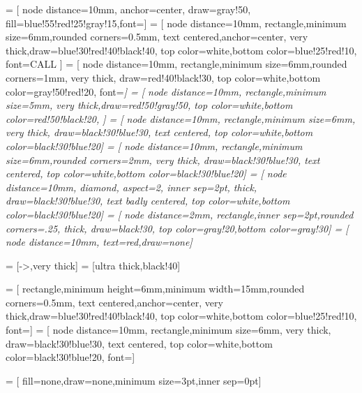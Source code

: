   = [
      node distance=10mm,
      anchor=center,
      draw=gray!50,
      fill=blue!55!red!25!gray!15,font=\scriptsize]
    = [
      node distance=10mm,
      rectangle,minimum size=6mm,rounded corners=0.5mm,
      text centered,anchor=center,
      very thick,draw=blue!30!red!40!black!40,
      top color=white,bottom color=blue!25!red!10,
      font=CALL \ttfamily]
        = [
      node distance=10mm,
      rectangle,minimum size=6mm,rounded corners=1mm,
      very thick, draw=red!40!black!30,
      top color=white,bottom color=gray!50!red!20,
      font=\scriptsize\itshape]
    = [
      node distance=10mm,
      rectangle,minimum size=5mm,
      very thick,draw=red!50!gray!50,
      top color=white,bottom color=red!50!black!20,
      ]
     = [
      node distance=10mm,
      rectangle,minimum size=6mm,
      very thick, draw=black!30!blue!30, text centered,
      top color=white,bottom color=black!30!blue!20]
  = [
      node distance=10mm,
      rectangle,minimum size=6mm,rounded corners=2mm,
      very thick, draw=black!30!blue!30, text centered,
      top color=white,bottom color=black!30!blue!20]
    = [
      node distance=10mm,
      diamond, aspect=2, inner sep=2pt,
      thick, draw=black!30!blue!30, text badly centered,
      top color=white,bottom color=black!30!blue!20]
      = [
      node distance=2mm,
      rectangle,inner sep=2pt,rounded corners=.25\baselineskip,
      thick, draw=black!30,
      top color=gray!20,bottom color=gray!30]
      = [
      node distance=10mm,
      text=red,draw=none]

 = [->,very thick]  %
 = [ultra thick,black!40] %

    = [
      rectangle,minimum height=6mm,minimum width=15mm,rounded corners=0.5mm,
      text centered,anchor=center,
      very thick,draw=blue!30!red!40!black!40,
      top color=white,bottom color=blue!25!red!10,
      font=\ttfamily]
  = [
      node distance=10mm,
      rectangle,minimum size=6mm,
      very thick, draw=black!30!blue!30, text centered,
      top color=white,bottom color=black!30!blue!20,
      font=\ttfamily]

    = [
      fill=none,draw=none,minimum size=3pt,inner sep=0pt]


